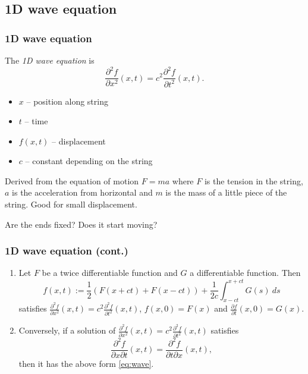 \documentclass[aspectratio=169,handout]{beamer}
\begin{document}
\subsection{1D wave equation}

\begin{frame}
    \frametitle{1D wave equation}

    The \emph{1D wave equation} is
    \[
        \frac{\partial^2 f}{\partial x^2}(x,t) = c^2  \frac{\partial^2 f}{\partial t^2}(x,t).
    \]
    \begin{itemize}
        \item  \(x\) -- position along string
        \item \(t\) -- time
        \item \(f(x,t)\) -- displacement
        \item \(c\) -- constant depending on the string
    \end{itemize}

    Derived from the equation of motion \(F = m a\) where \(F\) is the tension in the string, \(a\) is the acceleration from horizontal and \(m\) is the mass of a little piece of the string.
    Good for small displacement.

    Are the ends fixed? Does it start moving?

\end{frame}




\begin{frame}
    \frametitle{1D wave equation (cont.)}

    \begin{theorem}
        \begin{enumerate}
            \item
                  Let \(F\) be a twice differentiable function and \(G\) a differentiable function. Then
                  \begin{equation}
                      \label{eq:wave}
                      f(x,t) := \frac{1}{2}(F(x+ct) + F(x-ct)) + \frac{1}{2c} \int_{x-ct}^{x+ct} G(s) \ ds
                  \end{equation}
                  satisfies \(   \frac{\partial^2 f}{\partial x^2}(x,t) = c^2  \frac{\partial^2 f}{\partial t^2}(x,t) \),
                  \(f(x,0) = F(x)\)
                  and \(\frac{\partial f}{\partial t}(x,0) = G(x)\).
            \item
                  Conversely, if a solution of  \(   \frac{\partial^2 f}{\partial x^2}(x,t) = c^2  \frac{\partial^2 f}{\partial t^2}(x,t) \) satisfies
                  \[\frac{\partial^2 f}{\partial x \partial t}(x,t) = \frac{\partial^2 f}{\partial t \partial x}(x,t),\]
                  then it has the above form \eqref{eq:wave}.
        \end{enumerate}

    \end{theorem}

\end{frame}
\end{document}
